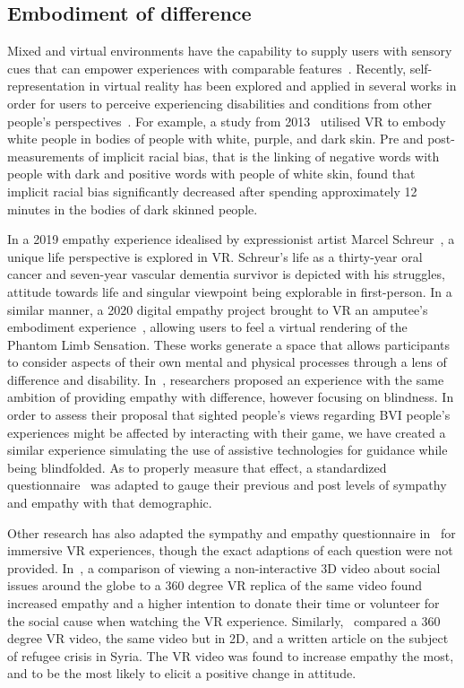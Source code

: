 \documentclass{vgtc}                          %
\begin{document}
\subsection{Embodiment of difference} Mixed and virtual environments have the capability to supply users with sensory cues that can empower experiences with comparable features~\cite{ahn2011embodied, guareseEmpathy:2021}. Recently, self-representation in virtual reality has been explored and applied in several works in order for users to perceive experiencing disabilities and conditions from other people's perspectives~\cite{bacchus2019life, calepso2020, guareseEmpathy:2021, kandaurova2019effects, bujic2020empathy}. For example, a study from 2013~\cite{peck_black} utilised VR to embody white people in bodies of people with white, purple, and dark skin. Pre and post-measurements of implicit racial bias, that is the linking of negative words with people with dark and positive words with people of white skin, found that implicit racial bias significantly decreased after spending approximately 12 minutes in the bodies of dark skinned people.

In a 2019 empathy experience idealised by expressionist artist Marcel Schreur~\cite{bacchus2019life}, a unique life perspective is explored in VR. Schreur's life as a thirty-year oral cancer and seven-year vascular dementia survivor is depicted with his struggles, attitude towards life and singular viewpoint being explorable in first-person. In a similar manner, a 2020 digital empathy project brought to VR an amputee's embodiment experience~\cite{calepso2020, Guarese:Xchange}, allowing users to feel a virtual rendering of the Phantom Limb Sensation. These works generate a space that allows participants to consider aspects of their own mental and physical processes through a lens of difference and disability. In~\cite{guareseEmpathy:2021}, researchers proposed an experience with the same ambition of providing empathy with difference, however focusing on blindness. In order to assess their proposal that sighted people's views regarding BVI people’s experiences might be affected by interacting with their game, we have created a similar experience simulating the use of assistive technologies for guidance while being blindfolded. As to properly measure that effect, a standardized questionnaire~\cite{Escalas:2003} was adapted to gauge their previous and post levels of sympathy and empathy with that demographic. 

Other research has also adapted the sympathy and empathy questionnaire in~\cite{Escalas:2003} for immersive VR experiences, though the exact adaptions of each question were not provided. In~\cite{kandaurova2019effects}, a comparison of viewing a non-interactive 3D video about social issues around the globe to a 360 degree VR replica of the same video found increased empathy and a higher intention to donate their time or volunteer for the social cause when watching the VR experience. Similarly,~\cite{bujic2020empathy} compared a 360 degree VR video, the same video but in 2D, and a written article on the subject of refugee crisis in Syria. The VR video was found to increase empathy the most, and to be the most likely to elicit a positive change in attitude. 
\end{document}
